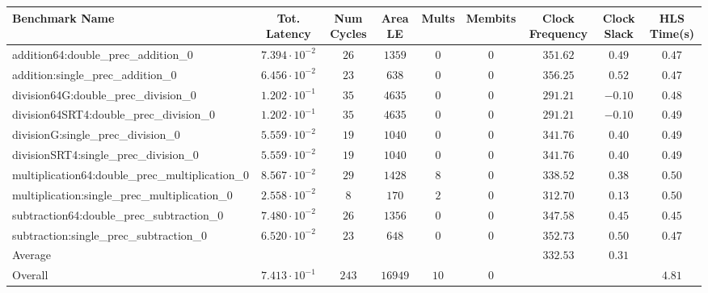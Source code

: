 \begin{tabular}{|l|c|c|c|c|c|c|c|c|}
\hline
Benchmark Name                                   & Tot. Latency            & Num Cycles & Area LE   & Mults  & Membits & Clock Frequency & Clock Slack & HLS Time(s) \\
\hline
addition64:double\_prec\_addition\_0             & $ 7.394 \cdot 10^{-2} $ & $ 26     $ & $ 1359  $ & $ 0  $ & $ 0   $ & $ 351.62      $ & $ 0.49    $ & $ 0.47    $ \\
addition:single\_prec\_addition\_0               & $ 6.456 \cdot 10^{-2} $ & $ 23     $ & $ 638   $ & $ 0  $ & $ 0   $ & $ 356.25      $ & $ 0.52    $ & $ 0.47    $ \\
division64G:double\_prec\_division\_0            & $ 1.202 \cdot 10^{-1} $ & $ 35     $ & $ 4635  $ & $ 0  $ & $ 0   $ & $ 291.21      $ & $ -0.10   $ & $ 0.48    $ \\
division64SRT4:double\_prec\_division\_0         & $ 1.202 \cdot 10^{-1} $ & $ 35     $ & $ 4635  $ & $ 0  $ & $ 0   $ & $ 291.21      $ & $ -0.10   $ & $ 0.49    $ \\
divisionG:single\_prec\_division\_0              & $ 5.559 \cdot 10^{-2} $ & $ 19     $ & $ 1040  $ & $ 0  $ & $ 0   $ & $ 341.76      $ & $ 0.40    $ & $ 0.49    $ \\
divisionSRT4:single\_prec\_division\_0           & $ 5.559 \cdot 10^{-2} $ & $ 19     $ & $ 1040  $ & $ 0  $ & $ 0   $ & $ 341.76      $ & $ 0.40    $ & $ 0.49    $ \\
multiplication64:double\_prec\_multiplication\_0 & $ 8.567 \cdot 10^{-2} $ & $ 29     $ & $ 1428  $ & $ 8  $ & $ 0   $ & $ 338.52      $ & $ 0.38    $ & $ 0.50    $ \\
multiplication:single\_prec\_multiplication\_0   & $ 2.558 \cdot 10^{-2} $ & $ 8      $ & $ 170   $ & $ 2  $ & $ 0   $ & $ 312.70      $ & $ 0.13    $ & $ 0.50    $ \\
subtraction64:double\_prec\_subtraction\_0       & $ 7.480 \cdot 10^{-2} $ & $ 26     $ & $ 1356  $ & $ 0  $ & $ 0   $ & $ 347.58      $ & $ 0.45    $ & $ 0.45    $ \\
subtraction:single\_prec\_subtraction\_0         & $ 6.520 \cdot 10^{-2} $ & $ 23     $ & $ 648   $ & $ 0  $ & $ 0   $ & $ 352.73      $ & $ 0.50    $ & $ 0.47    $ \\
\hline
Average                                          & $                     $ & $        $ & $       $ & $    $ & $     $ & $ 332.53      $ & $ 0.31    $ & $         $ \\
\hline
Overall                                          & $ 7.413 \cdot 10^{-1} $ & $ 243    $ & $ 16949 $ & $ 10 $ & $ 0   $ & $             $ & $         $ & $ 4.81    $ \\
\hline
\end{tabular}
